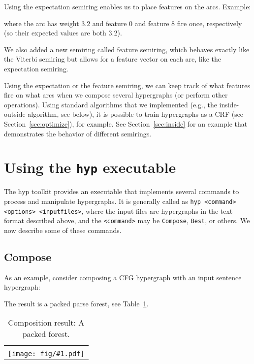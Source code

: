 \documentclass[12pt]{article}
\newcommand{\yellowlisting}[1]{%
  }
\newcommand{\hyp}{\texttt{hyp}\xspace}
\newcommand{\code}[1]{\texttt{#1}}
\newcommand{\tabref}[1]{Table~\ref{tab:#1}}
\newcommand{\secref}[1]{Section~\ref{sec:#1}}
\newcommand{\example}[4]{
  \begin{table}[!tbp]
    \centering
    \begin{tabular}{ l }\hline
      
      \vspace{#4}
      \\
      \texttt{[image: fig/\#1.pdf]} \\\hline
    \end{tabular}
    \caption{#2}
    \label{tab:#1}
  \end{table}
}
\begin{document}
Using the expectation semiring enables us to place features on the
arcs. Example:
\yellowlisting{fig/expectation-arc.txt}

where the arc has weight 3.2 and feature 0 and feature 8 fire once,
respectively (so their expected values are both 3.2).

We also added a new semiring called feature semiring, which behaves
exactly like the Viterbi semiring but allows for a feature vector on
each arc, like the expectation semiring.

Using the expectation or the feature semiring, we can keep track of
what features fire on what arcs when we compose several hypergraphs
(or perform other operations). Using standard algorithms that we
implemented (e.g., the inside-outside algorithm, see below), it is
possible to train hypergraphs as a CRF (see \secref{optimize}), for
example. See \secref{inside} for an example that demonstrates the
behavior of different semirings.

\section{Using the \hyp executable}

The hyp toolkit provides an executable that implements several
commands to process and manipulate hypergraphs. It is generally called
as \code{hyp <command> <options> <inputfiles>}, where the input files
are hypergraphs in the text format described above, and the
\code{<command>} may be \code{Compose}, \code{Best}, or others. We now
describe some of these commands.

\subsection{Compose}\label{sec:compose}

As an example, consider composing a CFG hypergraph with an input
sentence hypergraph:


\noindent The result is a packed parse forest, see
\tabref{compose_result}.
\example{compose_result}{Composition result: A packed forest.}{0.8}{0.3cm}
\end{document}

